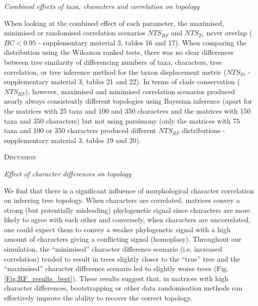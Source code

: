 \documentclass[12pt,letterpaper]{article}
\renewcommand{\section}[1]{%
\bigskip
\begin{center}
\begin{Large}
\normalfont\scshape #1
\medskip
\end{Large}
\end{center}}
\renewcommand{\subsection}[1]{%
\bigskip
\begin{center}
\begin{large}
\normalfont\itshape #1
\end{large}
\end{center}}
\begin{document}
\subsection{Combined effects of taxa, characters and correlation on topology}
When looking at the combined effect of each parameter, the maximised, minimised or randomised correlation scenarios $NTS_{RF}$ and $NTS_{Tr}$ never overlap ($BC < 0.95$ - supplementary material 3, tables 16 and 17).
When comparing the distribution using the Wilcoxon ranked tests, there was no clear differences between tree similarity of differencing numbers of taxa, characters, tree correlation, or tree inference method for the taxon displacement metric ($NTS_{Tr}$ - supplementary material 3, tables 21 and 22).
In terms of clade conservation ($NTS_{RF}$), however, maximised and minimised correlation scenarios produced nearly always consistently different topologies using Bayesian inference (apart for the matrices with 25 taxa and 100 and 350 characters and the matrices with 150 taxa and 350 characters) but not using parsimony (only the matrices with 75 taxa and 100 or 350 characters produced different $NTS_{RF}$ distributions - supplementary material 3, tables 19 and 20).

\section{Discussion}

\subsection{Effect of character differences on topology}
We find that there is a significant influence of morphological character correlation on inferring tree topology.
When characters are correlated, matrices convey a strong (but potentially misleading) phylogenetic signal since characters are more likely to agree with each other and conversely, when characters are uncorrelated, one could expect them to convey a weaker phylogenetic signal with a high amount of characters giving a conflicting signal (homoplasy).
Throughout our simulation, the ``minimised'' character difference scenario (i.e. increased correlation) tended to result in trees slightly closer to the ``true'' tree and the ``maximised'' character difference scenario led to slightly worse trees (Fig. \ref{Fig:RF_results_best}).
These results suggest that, in matrices with high character differences, bootstrapping or other data randomisation methods can effectively improve the ability to recover the correct topology.
\end{document}
